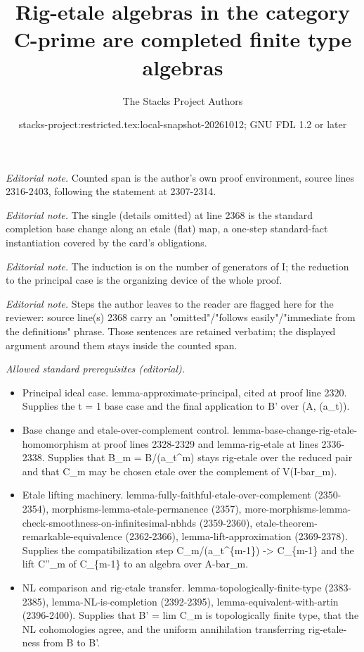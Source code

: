 \documentclass{stacks-project}
\title{Rig-etale algebras in the category C-prime are completed finite type algebras}
\author{The Stacks Project Authors}
\date{stacks-project:restricted.tex:local-snapshot-20261012; GNU FDL 1.2 or later}
\theoremstyle{plain}
\theoremstyle{definition}
\theoremstyle{remark}
\numberwithin{equation}{subsection}
\begin{document}
\maketitle
\noindent\textit{Editorial note.} Counted span is the author's own proof environment, source lines 2316-2403, following the statement at 2307-2314.\par\medskip
\noindent\textit{Editorial note.} The single (details omitted) at line 2368 is the standard completion base change along an etale (flat) map, a one-step standard-fact instantiation covered by the card's obligations.\par\medskip
\noindent\textit{Editorial note.} The induction is on the number of generators of I; the reduction to the principal case is the organizing device of the whole proof.\par\medskip
\noindent\textit{Editorial note.} Steps the author leaves to the reader are flagged here for the reviewer: source line(s) 2368 carry an "omitted"/"follows easily"/"immediate from the definitions" phrase. Those sentences are retained verbatim; the displayed argument around them stays inside the counted span.\par\medskip
\noindent\textit{Allowed standard prerequisites (editorial).}\begin{itemize}
\item Principal ideal case. lemma-approximate-principal, cited at proof line 2320. Supplies the t = 1 base case and the final application to B' over (A, (a\_t)).
\item Base change and etale-over-complement control. lemma-base-change-rig-etale-homomorphism at proof lines 2328-2329 and lemma-rig-etale at lines 2336-2338. Supplies that B\_m = B/(a\_t\textasciicircum{}m) stays rig-etale over the reduced pair and that C\_m may be chosen etale over the complement of V(I-bar\_m).
\item Etale lifting machinery. lemma-fully-faithful-etale-over-complement (2350-2354), morphisms-lemma-etale-permanence (2357), more-morphisms-lemma-check-smoothness-on-infinitesimal-nbhds (2359-2360), etale-theorem-remarkable-equivalence (2362-2366), lemma-lift-approximation (2369-2378). Supplies the compatibilization step C\_m/(a\_t\textasciicircum{}\{m-1\}) -> C\_\{m-1\} and the lift C''\_m of C\_\{m-1\} to an algebra over A-bar\_m.
\item NL comparison and rig-etale transfer. lemma-topologically-finite-type (2383-2385), lemma-NL-is-completion (2392-2395), lemma-equivalent-with-artin (2396-2400). Supplies that B' = lim C\_m is topologically finite type, that the NL cohomologies agree, and the uniform annihilation transferring rig-etale-ness from B to B'.
\end{itemize}\medskip
\end{document}

